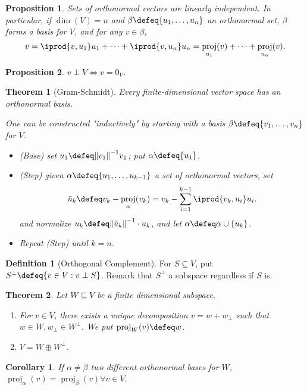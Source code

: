 \documentclass[12pt, oneside]{article}
\theoremstyle{definition}
\newtheorem{defn}{Definition}
\theoremstyle{plain}
\newtheorem{thm}{Theorem}
\newtheorem{cor}{Corollary}
\newtheorem{prop}{Proposition}
\theoremstyle{remark}
\DeclareMathOperator{\proj}{proj}
\begin{document}
\begin{prop}
  Sets of orthonormal vectors are linearly independent. In particular, if $\dim(V) = n$ and $\beta \defeq \{u_1, \dots, u_n\}$ an orthonormal set, $\beta$ forms a basis for $V$, and for any $v \in \beta$, \[
  v = \iprod{v, u_1}u_1 + \cdots + \iprod{v, u_n} u_n = \proj_{u_1}(v) + \cdots + \proj_{u_n}(v).
  \]
\end{prop}
\begin{prop}
  $v \perp V \iff v = 0_V$.
\end{prop}
\begin{thm}[Gram-Schmidt]
  Every finite-dimensional vector space has an orthonormal basis.

  One can be constructed "inductively" by starting with a basis $\beta \defeq \{v_1, \dots, v_n\}$ for $V$. \begin{itemize}
    \item (Base) set $u_1 \defeq \norm{v_1}^{-1} v_1$; put $\alpha \defeq \{u_1\}$.
    \item (Step) given $\alpha \defeq \{u_1, \dots, u_{k-1}\}$ a set of orthonormal vectors, set \[
    \tilde{u}_{k} \defeq v_{k} - \proj_{\alpha}(v_k) = v_k - \sum_{i=1}^{k-1} \iprod{v_k, u_i} u_i.
    \]
    and normalize $u_k \defeq \norm{\tilde{u}_k}^{-1} \cdot u_k$, and let $\alpha \defeq \alpha \cup \{u_k\}$.
    \item Repeat (Step) until $k = n$.
  \end{itemize}
\end{thm}

\begin{defn}[Orthogonal Complement]
  For $S \subseteq V$, put $S^\perp \defeq \{v \in V : v \perp S\}$. Remark that $S^\perp$ a subspace regardless if $S$ is.
\end{defn}

\begin{thm}
  Let $W \subseteq V$ be a finite dimensional subspace.
  \begin{enumerate}[label=(\alph*)]
    \item For $v \in V$, there exists a unique decomposition $v = w + w_\perp$ such that $w \in W, w_\perp \in W^\perp$. We put $\proj_W(v) \defeq w$.
    \item $V = W \oplus W^\perp$.
  \end{enumerate}
\end{thm}
\begin{cor}
  If $\alpha \neq \beta$ two different orthonormal bases for $W$, $\proj_\alpha(v) = \proj_\beta(v) \forall v \in V$.
\end{cor}
\end{document}
